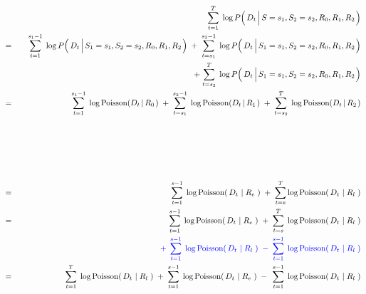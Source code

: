 \begin{eqnarray*}
&&
	\overset{T}{\underset{t=1}{\sum}}\;
	\log P\!\left(\,D_{t} \left\vert\,S\overset{{\color{white}1}}{=}s_{1},S_{2}=s_{2},R_{0},R_{1},R_{2}\right.\right)
\\
&=&
	{\color{white}+} \;
	\overset{s_{1}-1}{\underset{t=1}{\sum}}\;
	\log P\!\left(\,D_{t} \left\vert\,S_{1}\overset{{\color{white}1}}{=}s_{1},S_{2}=s_{2},R_{0},R_{1},R_{2}\right.\right)
	\; + \;
	\overset{s_{2}-1}{\underset{t=s_{1}}{\sum}}\;
	\log P\!\left(\,D_{t} \left\vert\,S_{1}\overset{{\color{white}1}}{=}s_{1},S_{2}=s_{2},R_{0},R_{1},R_{2}\right.\right)
\\
&&
	+ \;
	\overset{T}{\underset{t=s_{2}}{\sum}}\;
	\log P\!\left(\,D_{t} \left\vert\,S_{1}\overset{{\color{white}1}}{=}s_{1},S_{2}=s_{2},R_{0},R_{1},R_{2}\right.\right)
\\
&=&
	\overset{s_{1}-1}{\underset{t=1}{\sum}}\;
	\log \textnormal{Poisson}\!\left(D_{t} \left\vert\,R_{0}\right.\right)
	\; + \;
	\overset{s_{2}-1}{\underset{t=s_{1}}{\sum}}\;
	\log \textnormal{Poisson}\!\left(D_{t} \left\vert\,R_{1}\right.\right)
	\; + \;
	\overset{T}{\underset{t=s_{2}}{\sum}}\;
	\log \textnormal{Poisson}\!\left(D_{t} \left\vert\,R_{2}\right.\right)
\\
\\
\\
\\
\\
\\
&=&
	\overset{s-1}{\underset{t=1}{\sum}}\;
	\log\textnormal{Poisson}\!\left(\,D_{t} \,\left\vert\; R_{e}\right.\,\right)
	\; + \;
	\overset{T}{\underset{t=s}{\sum}}
	\log\textnormal{Poisson}\!\left(\,D_{t} \,\left\vert\; R_{l}\right.\,\right)
\\
&=&
	{\color{white}+}\;\,
	\overset{s-1}{\underset{t=1}{\sum}}\;
	\log\textnormal{Poisson}\!\left(\,D_{t} \,\left\vert\; R_{e}\right.\,\right)
	\; + \;
	\overset{T}{\underset{t=s}{\sum}}\;
	\log\textnormal{Poisson}\!\left(\,D_{t} \,\left\vert\; R_{l}\right.\,\right)
\\
&&
	{\color{blue}
	+\;\,
	\overset{s-1}{\underset{t=1}{\sum}}\;
	\log\textnormal{Poisson}\!\left(\,D_{t} \,\left\vert\; R_{l}\right.\,\right)
	\; - \;
	\overset{s-1}{\underset{t=1}{\sum}}\;
	\log\textnormal{Poisson}\!\left(\,D_{t} \,\left\vert\; R_{l}\right.\,\right)
	}
\\
&=&
	\overset{T}{\underset{t=1}{\sum}}\;
	\log\textnormal{Poisson}\!\left(\,D_{t} \,\left\vert\; R_{l}\right.\,\right)
	\;+\;
	\overset{s-1}{\underset{t=1}{\sum}}\;
	\log\textnormal{Poisson}\!\left(\,D_{t} \,\left\vert\; R_{e}\right.\,\right)
		\;-\;\,
		\overset{s-1}{\underset{t=1}{\sum}}\;
		\log\textnormal{Poisson}\!\left(\,D_{t} \,\left\vert\; R_{l}\right.\,\right)
\end{eqnarray*}
